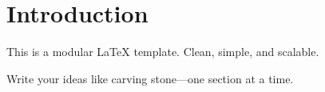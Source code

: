 \section{Introduction}

This is a modular LaTeX template. Clean, simple, and scalable.

Write your ideas like carving stone—one section at a time.
